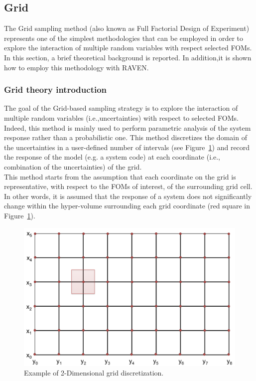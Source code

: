 \subsection{Grid}
\label{sub:Grid}
The Grid sampling method (also known as Full Factorial Design of Experiment) represents one of the simplest methodologies that can be employed in order to explore the interaction of multiple random variables with respect
selected FOMs.
In this section, a brief theoretical
background is reported. In addition,it is shown how to employ this methodology with RAVEN.
\subsubsection{Grid theory introduction}
\label{subsub:Gridtheory}
The goal of the Grid-based sampling strategy is to explore the interaction of multiple random
variables (i.e.,uncertainties) with respect to selected FOMs. Indeed, this method is mainly used to perform
parametric analysis of the system response rather than a probabilistic one. This method discretizes the
domain of the uncertainties in a user-defined number of intervals (see Figure~\ref{fig:GridDiscretization}) and
record the response of the model (e.g. a system code) at each coordinate (i.e., combination of the uncertainties) of the grid.
\\ This method starts from the assumption that each coordinate on the grid is representative, with respect to the FOMs of interest, of the surrounding grid cell. In other words, it is assumed that the response of a system does not significantly change within the hyper-volume surrounding each grid coordinate (red square in Figure~\ref{fig:GridDiscretization}).
 \begin{figure}[h!]
  \centering
  \includegraphics[scale=0.7]{pics/GridDiscretization.png}
  \caption{Example of 2-Dimensional grid discretization. }
  \label{fig:GridDiscretization}
 \end{figure}

